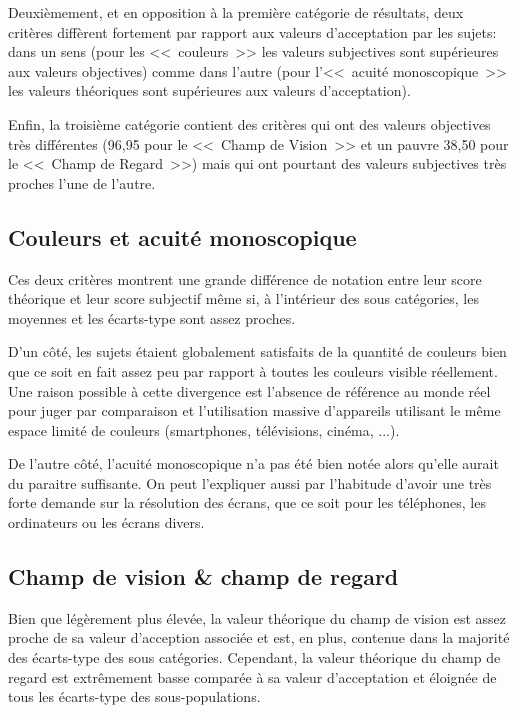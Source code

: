 	\par Deuxièmement, et en opposition à la première catégorie de résultats, deux critères diffèrent fortement par rapport aux valeurs d'acceptation par les sujets: dans un sens (pour les <<~couleurs~>> les valeurs subjectives sont supérieures aux valeurs objectives) comme dans l'autre (pour l'<<~acuité monoscopique~>> les valeurs théoriques sont supérieures aux valeurs d'acceptation).
	
	\par Enfin, la troisième catégorie contient des critères qui ont des valeurs objectives très différentes (96,95 pour le  <<~Champ de Vision~>> et un pauvre 38,50 pour le <<~Champ de Regard~>>) mais qui ont pourtant des valeurs subjectives très proches l'une de l'autre.   
	
	\subsection{Couleurs et acuité monoscopique}
	\par Ces deux critères montrent une grande différence de notation entre leur score théorique et leur score subjectif même si, à l'intérieur des sous catégories, les moyennes et les écarts-type sont assez proches.
	
	\par D'un côté, les sujets étaient globalement satisfaits de la quantité de couleurs bien que ce soit en fait assez peu par rapport à toutes les couleurs visible réellement. Une raison possible à cette divergence est l'absence de référence au monde réel pour juger par comparaison et l'utilisation massive d'appareils utilisant le même espace limité de couleurs (smartphones, télévisions, cinéma, ...).
	
	\par De l'autre côté, l'acuité monoscopique n'a pas été bien notée alors qu'elle aurait du paraitre suffisante. On peut l'expliquer aussi par l'habitude d'avoir une très forte demande sur la résolution des écrans, que ce soit pour les téléphones, les ordinateurs ou les écrans divers.
	
	\subsection{Champ de vision \& champ de regard}
	\par Bien que légèrement plus élevée, la valeur théorique du champ de vision est assez proche de sa valeur d'acception associée et est, en plus, contenue dans la majorité des écarts-type des sous catégories. Cependant, la valeur théorique du champ de regard est extrêmement basse comparée à sa valeur d'acceptation et éloignée de tous les écarts-type des sous-populations.
	
